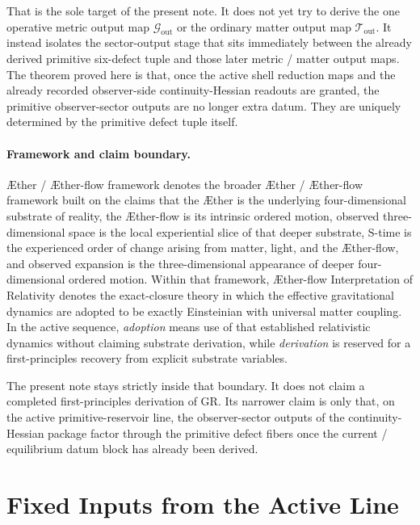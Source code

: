 \documentclass[11pt]{article}
\newcommand{\Aether}{\AE{}ther}
\newcommand{\Aflow}{\AE{}ther-flow}
\newcommand{\TheoryName}{\Aflow{} Interpretation of Relativity}
\newcommand{\TheoryProgram}{\Aether{} / \Aflow{} framework}
\newcommand{\MetricOut}{\mathscr G_{\mathrm{out}}}
\newcommand{\MatterOut}{\mathscr T_{\mathrm{out}}}
\begin{document}
That is the sole target of the present note. It does not yet try to derive the one operative metric output map \(\MetricOut\) or the ordinary matter output map \(\MatterOut\). It instead isolates the sector-output stage that sits immediately between the already derived primitive six-defect tuple and those later metric / matter output maps. The theorem proved here is that, once the active shell reduction maps and the already recorded observer-side continuity-Hessian readouts are granted, the primitive observer-sector outputs are no longer extra datum. They are uniquely determined by the primitive defect tuple itself.

\paragraph{Framework and claim boundary.}
\TheoryProgram{} denotes the broader \Aether{} / \Aflow{} framework built on the claims that the \Aether{} is the underlying four-dimensional substrate of reality, the \Aflow{} is its intrinsic ordered motion, observed three-dimensional space is the local experiential slice of that deeper substrate, S-time is the experienced order of change arising from matter, light, and the \Aflow{}, and observed expansion is the three-dimensional appearance of deeper four-dimensional ordered motion. Within that framework, \TheoryName{} denotes the exact-closure theory in which the effective gravitational dynamics are adopted to be exactly Einsteinian with universal matter coupling. In the active sequence, \emph{adoption} means use of that established relativistic dynamics without claiming substrate derivation, while \emph{derivation} is reserved for a first-principles recovery from explicit substrate variables.

The present note stays strictly inside that boundary. It does not claim a completed first-principles derivation of GR. Its narrower claim is only that, on the active primitive-reservoir line, the observer-sector outputs of the continuity-Hessian package factor through the primitive defect fibers once the current / equilibrium datum block has already been derived.

\section{Fixed Inputs from the Active Line}
\end{document}
